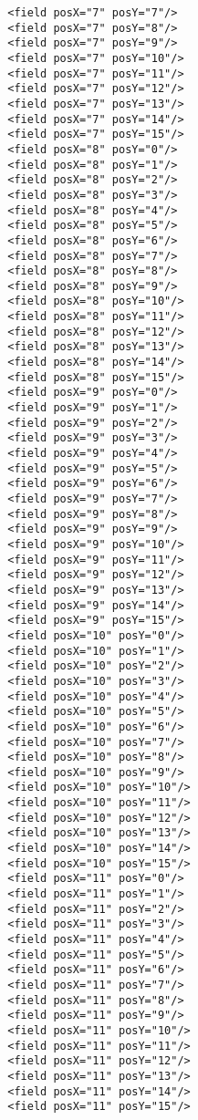 \documentclass[12pt,a4paper, ngerman, oneside]{scrartcl}
\begin{document}
\begin{enumerate}
\begin{verbatim}
        <field posX="7" posY="7"/>
        <field posX="7" posY="8"/>
        <field posX="7" posY="9"/>
        <field posX="7" posY="10"/>
        <field posX="7" posY="11"/>
        <field posX="7" posY="12"/>
        <field posX="7" posY="13"/>
        <field posX="7" posY="14"/>
        <field posX="7" posY="15"/>
        <field posX="8" posY="0"/>
        <field posX="8" posY="1"/>
        <field posX="8" posY="2"/>
        <field posX="8" posY="3"/>
        <field posX="8" posY="4"/>
        <field posX="8" posY="5"/>
        <field posX="8" posY="6"/>
        <field posX="8" posY="7"/>
        <field posX="8" posY="8"/>
        <field posX="8" posY="9"/>
        <field posX="8" posY="10"/>
        <field posX="8" posY="11"/>
        <field posX="8" posY="12"/>
        <field posX="8" posY="13"/>
        <field posX="8" posY="14"/>
        <field posX="8" posY="15"/>
        <field posX="9" posY="0"/>
        <field posX="9" posY="1"/>
        <field posX="9" posY="2"/>
        <field posX="9" posY="3"/>
        <field posX="9" posY="4"/>
        <field posX="9" posY="5"/>
        <field posX="9" posY="6"/>
        <field posX="9" posY="7"/>
        <field posX="9" posY="8"/>
        <field posX="9" posY="9"/>
        <field posX="9" posY="10"/>
        <field posX="9" posY="11"/>
        <field posX="9" posY="12"/>
        <field posX="9" posY="13"/>
        <field posX="9" posY="14"/>
        <field posX="9" posY="15"/>
        <field posX="10" posY="0"/>
        <field posX="10" posY="1"/>
        <field posX="10" posY="2"/>
        <field posX="10" posY="3"/>
        <field posX="10" posY="4"/>
        <field posX="10" posY="5"/>
        <field posX="10" posY="6"/>
        <field posX="10" posY="7"/>
        <field posX="10" posY="8"/>
        <field posX="10" posY="9"/>
        <field posX="10" posY="10"/>
        <field posX="10" posY="11"/>
        <field posX="10" posY="12"/>
        <field posX="10" posY="13"/>
        <field posX="10" posY="14"/>
        <field posX="10" posY="15"/>
        <field posX="11" posY="0"/>
        <field posX="11" posY="1"/>
        <field posX="11" posY="2"/>
        <field posX="11" posY="3"/>
        <field posX="11" posY="4"/>
        <field posX="11" posY="5"/>
        <field posX="11" posY="6"/>
        <field posX="11" posY="7"/>
        <field posX="11" posY="8"/>
        <field posX="11" posY="9"/>
        <field posX="11" posY="10"/>
        <field posX="11" posY="11"/>
        <field posX="11" posY="12"/>
        <field posX="11" posY="13"/>
        <field posX="11" posY="14"/>
        <field posX="11" posY="15"/>

\end{verbatim}
\end{enumerate}
\end{document}
